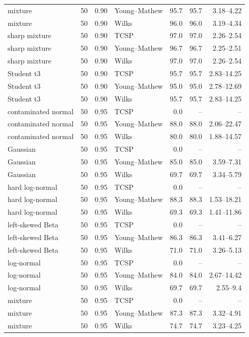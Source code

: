\begin{longtable}{@{}p{}rrp{}rrr@{}}
mixture & 50 & 0.90 & Young--Mathew & 95.7 & 95.7 & 3.18--4.22 \\
mixture & 50 & 0.90 & Wilks & 96.0 & 96.0 & 3.19--4.34 \\
sharp mixture & 50 & 0.90 & TCSP & 97.0 & 97.0 & 2.26--2.54 \\
sharp mixture & 50 & 0.90 & Young--Mathew & 96.7 & 96.7 & 2.25--2.51 \\
sharp mixture & 50 & 0.90 & Wilks & 97.0 & 97.0 & 2.26--2.54 \\
Student t3 & 50 & 0.90 & TCSP & 95.7 & 95.7 & 2.83--14.25 \\
Student t3 & 50 & 0.90 & Young--Mathew & 95.0 & 95.0 & 2.78--12.69 \\
Student t3 & 50 & 0.90 & Wilks & 95.7 & 95.7 & 2.83--14.25 \\
contaminated normal & 50 & 0.95 & TCSP & 0.0 & -- & -- \\
contaminated normal & 50 & 0.95 & Young--Mathew & 88.0 & 88.0 & 2.06--22.47 \\
contaminated normal & 50 & 0.95 & Wilks & 80.0 & 80.0 & 1.88--14.57 \\
Gaussian & 50 & 0.95 & TCSP & 0.0 & -- & -- \\
Gaussian & 50 & 0.95 & Young--Mathew & 85.0 & 85.0 & 3.59--7.31 \\
Gaussian & 50 & 0.95 & Wilks & 69.7 & 69.7 & 3.34--5.79 \\
hard log-normal & 50 & 0.95 & TCSP & 0.0 & -- & -- \\
hard log-normal & 50 & 0.95 & Young--Mathew & 88.3 & 88.3 & 1.53--18.21 \\
hard log-normal & 50 & 0.95 & Wilks & 69.3 & 69.3 & 1.41--11.86 \\
left-skewed Beta & 50 & 0.95 & TCSP & 0.0 & -- & -- \\
left-skewed Beta & 50 & 0.95 & Young--Mathew & 86.3 & 86.3 & 3.41--6.27 \\
left-skewed Beta & 50 & 0.95 & Wilks & 71.0 & 71.0 & 3.26--5.13 \\
log-normal & 50 & 0.95 & TCSP & 0.0 & -- & -- \\
log-normal & 50 & 0.95 & Young--Mathew & 84.0 & 84.0 & 2.67--14.42 \\
log-normal & 50 & 0.95 & Wilks & 69.7 & 69.7 & 2.55--9.4 \\
mixture & 50 & 0.95 & TCSP & 0.0 & -- & -- \\
mixture & 50 & 0.95 & Young--Mathew & 87.3 & 87.3 & 3.32--4.91 \\
mixture & 50 & 0.95 & Wilks & 74.7 & 74.7 & 3.23--4.25 \\

\end{longtable}
